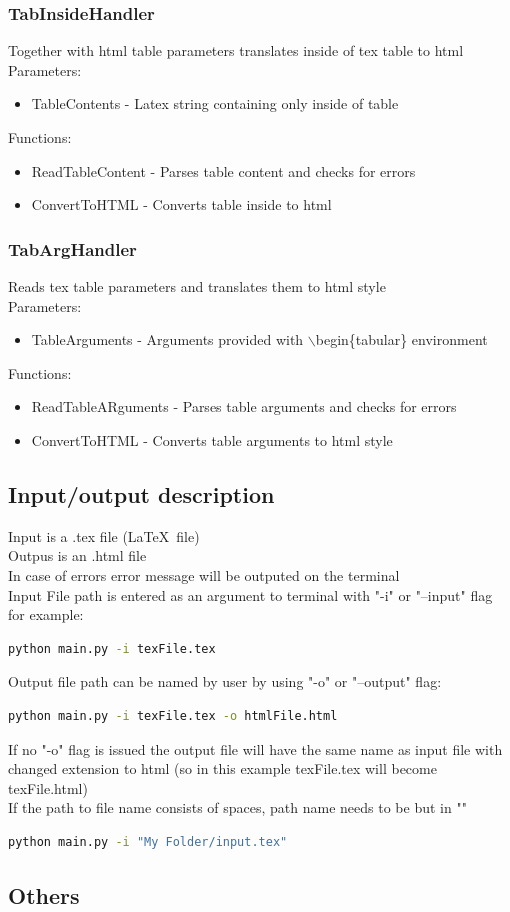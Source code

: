 \subsubsection{TabInsideHandler}
Together with html table parameters translates inside of tex table to html  \\ 
Parameters: \\ 
\begin{itemize}
\item TableContents - Latex string containing only inside of table
\end{itemize}
Functions: 
\begin{itemize}
    \item ReadTableContent - Parses table content and checks for errors 
    \item ConvertToHTML - Converts table inside to html
\end{itemize}

\subsubsection{TabArgHandler}
Reads tex table parameters and translates them to html style  \\ 
Parameters: \\ 
\begin{itemize}
\item TableArguments - Arguments provided with $\backslash$begin\{tabular\} environment
\end{itemize}
Functions: 
\begin{itemize}
    \item ReadTableARguments - Parses table arguments and checks for errors 
    \item ConvertToHTML - Converts table arguments to html style
\end{itemize}

\subsection{Input/output description}
Input is a .tex file (\LaTeX \, file) \\ 
Outpus is an .html file \\ 
In case of errors error message will be outputed on the terminal \\
Input File path is entered as an argument to terminal with "-i" or "--input" flag for example:
\begin{lstlisting}[language=bash]
python main.py -i texFile.tex
\end{lstlisting}
Output file path can be named by user by using "-o" or "--output" flag:
\begin{lstlisting}[language=bash]
python main.py -i texFile.tex -o htmlFile.html
\end{lstlisting}
If no "-o" flag is issued the output file will have the same name as input file with changed extension to html (so in this example texFile.tex will become texFile.html) \\ 
If the path to file name consists of spaces, path name needs to be but in ""
\begin{lstlisting}[language=bash]
python main.py -i "My Folder/input.tex"
\end{lstlisting}
\subsection{Others}
